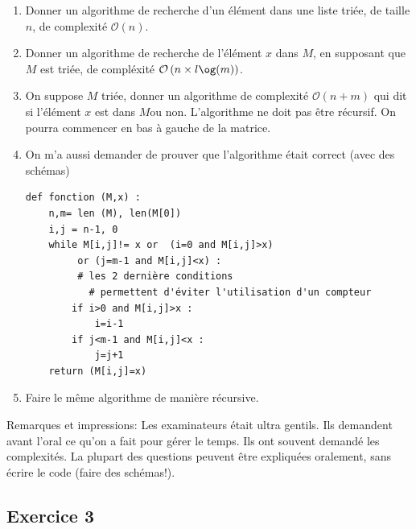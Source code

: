\documentclass[10pt,fleqn]{article} %
\begin{document}
\begin{multicols}{2}
\begin{enumerate}
\item Donner un algorithme de recherche d'un élément dans une liste triée, de taille $n$, de complexité $\mathcal{O}(n)$. 


\item Donner un algorithme de recherche de l'élément $x$ dans $M$, en supposant que $M$ est triée, de compléxité $\mathcal{O}\left(n\times l\og(m)\right)$.


\item On suppose $M$ triée, donner un algorithme de complexité $\mathcal{O}(n+m)$ qui dit si l'élément $x$ est dans $M $ou non. L'algorithme ne doit pas être récursif. On pourra commencer en bas à gauche de la matrice. %


\item On m'a aussi demander de prouver que l'algorithme était correct (avec des schémas)
\begin{lstlisting}
def fonction (M,x) :
	n,m= len (M), len(M[0])
	i,j = n-1, 0
	while M[i,j]!= x or  (i=0 and M[i,j]>x) 
	     or (j=m-1 and M[i,j]<x) : 
	     # les 2 dernière conditions
           # permettent d'éviter l'utilisation d'un compteur
		if i>0 and M[i,j]>x :
			i=i-1
		if j<m-1 and M[i,j]<x :
			j=j+1
	return (M[i,j]=x)
\end{lstlisting}





\item Faire le même algorithme de manière récursive.
\end{enumerate}

\begin{rem}
Remarques et impressions: Les examinateurs était ultra gentils.
Ils demandent avant l'oral ce qu'on a fait pour gérer le temps.
Ils ont souvent demandé les complexités.
La plupart des questions peuvent être expliquées oralement, sans écrire le code (faire des schémas!).
\end{rem}


\subsection*{Exercice 3}


\end{multicols}
\end{document}
